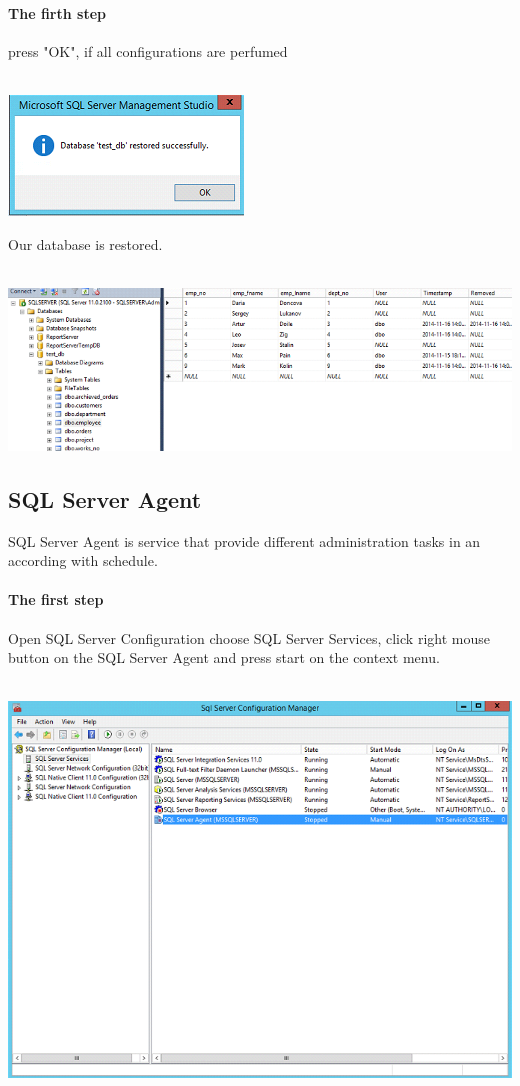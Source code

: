 \documentclass[english]{article}
\begin{document}
\paragraph{The firth step} press "OK", if all configurations are perfumed \\\\
\centerline{\includegraphics[scale=0.8]{administration/10}}
Our database is restored.\\\\
\centerline{\includegraphics[scale=0.8]{administration/11}}

\subsection{SQL Server Agent}
SQL Server Agent is service that provide different administration tasks in an according with schedule.
\paragraph{The first step} Open SQL Server Configuration choose SQL Server Services, click right mouse button on the SQL Server Agent and press start on the context menu.\\\\
\centerline{\includegraphics[scale=0.7]{administration/12}}
\end{document}
